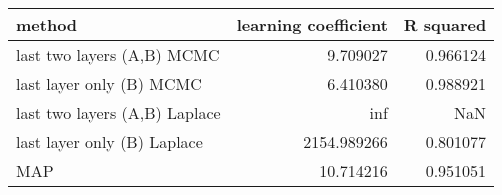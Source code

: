 \begin{tabular}{lrr}
\toprule
                        method &  learning coefficient &  R squared \\
\midrule
    last two layers (A,B) MCMC &              9.709027 &   0.966124 \\
      last layer only (B) MCMC &              6.410380 &   0.988921 \\
 last two layers (A,B) Laplace &                   inf &        NaN \\
   last layer only (B) Laplace &           2154.989266 &   0.801077 \\
                           MAP &             10.714216 &   0.951051 \\
\bottomrule
\end{tabular}
